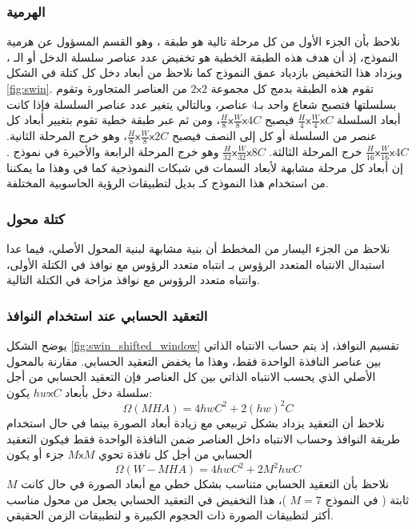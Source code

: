 \subsubsection{الهرمية
}
نلاحظ بأن الجزء الأول من كل مرحلة تالية هو طبقة
،
وهو القسم المسؤول عن هرمية النموذج، إذ أن هدف هذه الطبقة الخطية هو تخفيض عدد عناصر سلسلة الدخل أو الـ
،
ويزداد هذا التخفيض  بازدياد عمق النموذج
 كما نلاحظ من أبعاد دخل كل كتلة في الشكل 
\ref{fig:swin}.
\newline
تقوم هذه الطبقة بدمج كل مجموعة
$2\mathsf{x}2$ 
من العناصر المتجاورة وتقوم بسلسلتها فتصبح شعاع واحد بـ$4$ عناصر، وبالتالي يتغير عدد عناصر السلسلة 
فإذا كانت أبعاد السلسلة
$\frac{H}{4}\mathsf{x}\frac{W}{4}\mathsf{x}C$ 
فيصبح
$\frac{H}{8}\mathsf{x}\frac{W}{8}\mathsf{x}4C$،
ومن ثم عبر طبقة خطية تقوم بتغيير أبعاد كل عنصر من السلسلة أو كل 
إلى النصف فيصبح
$\frac{H}{8}\mathsf{x}\frac{W}{8}\mathsf{x}2C$،
وهو خرج المرحلة الثانية.
\newline
$\frac{H}{16}\mathsf{x}\frac{W}{16}\mathsf{x}4C$ 
خرج المرحلة الثالثة.
\newline
$\frac{H}{32}\mathsf{x}\frac{W}{32}\mathsf{x}8C$
وهو خرج المرحلة الرابعة والأخيرة في نموذج
.
\newline
إن أبعاد كل مرحلة مشابهة لأبعاد السمات في شبكات
النموذجية كما في
وهذا ما يمكننا من استخدام هذا النموذج كـ
بديل
لتطبيقات الرؤية الحاسوبية المختلفة.
\subsubsection{كتلة محول
}
نلاحظ من الجزء اليسار من المخطط أن بنية 
مشابهة لبنية المحول الأصلي، فيما عدا استبدال الانتباه المتعدد الرؤوس 
بـ انتباه متعدد الرؤوس مع نوافذ
في الكتلة الأولى، وانتباه متعدد الرؤوس مع نوافذ مزاحة 
في الكتلة التالية.
\subsubsection{التعقيد الحسابي عند استخدام النوافذ}
يوضح الشكل
\ref{fig:swin_shifted_window}
تقسيم النوافذ،
إذ يتم حساب الانتباه الذاتي بين عناصر النافذة الواحدة فقط، وهذا ما يخفض التعقيد الحسابي.
مقارنة بالمحول الأصلي الذي يحسب الانتباه الذاتي بين كل العناصر فإن التعقيد الحسابي من أجل سلسلة دخل بأبعاد 
$hw\mathsf{x}C$ 
يكون: 
\begin{equation}
\Omega(MHA) = 4hwC^2+2(hw)^2C
\end{equation}
نلاحظ أن التعقيد يزداد بشكل تربيعي مع زيادة أبعاد الصورة
بينما في حال استخدام طريقة النوافذ وحساب الانتباه داخل العناصر ضمن النافذة الواحدة فقط فيكون التعقيد الحسابي من أجل كل نافذة تحوي 
$M\mathsf{x}M$ 
جزء أو 
يكون
\begin{equation}
\Omega(W-MHA)=4hwC^2+2M^2hwC
\end{equation}
نلاحظ بأن التعقيد الحسابي متناسب بشكل خطي مع أبعاد الصورة في حال كانت
$M$ 
ثابتة ( في النموذج 
$M=7$
)،
هذا التخفيض في التعقيد الحسابي يجعل من محول 
مناسب أكثر لتطبيقات الصورة ذات الحجوم الكبيرة و لتطبيقات الزمن الحقيقي.
